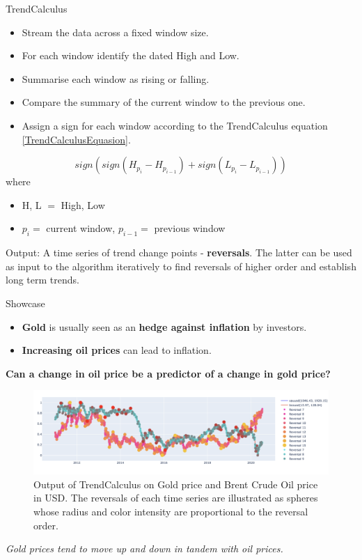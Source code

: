 \documentclass[final]{beamer}
\newlength{\colwidth}
\begin{document}
\begin{frame}[fragile]
\begin{columns}[t]
\begin{column}{\colwidth}
\begin{block}{TrendCalculus}
    \begin{itemize}
    \item Stream the data across a fixed window size. 
    \item For each window identify the dated High and Low. 
    \item Summarise each window as rising or falling.
    \item Compare the summary of the current window to the previous one. 
    \item Assign a sign for each window according to the TrendCalculus equation \ref{TrendCalculusEquasion}. 
    \end{itemize}
    \begin{equation}\label{TrendCalculusEquasion}
        sign(sign(H_{p_i}-H_{p_{i-1}})+sign(L_{p_i}-L_{p_{i-1}}))
    \end{equation} 
    where 
    \begin{itemize}
        \item H, L $=$ High, Low
        \item $p_i=$ current window,\hspace{0.4cm} $p_{i-1}=$ previous window
    \end{itemize}
   Output: A time series of trend change points - \textsf{\textbf{reversals}}. The latter can be used as input to the algorithm iteratively to find reversals of higher order and establish long term trends.
   \end{block}
   
   \begin{block}{Showcase}
  \begin{itemize}
      \item \textsf{\textbf{Gold}} is usually seen as an \textsf{\textbf{hedge against inflation}} by investors. \item \textsf{\textbf{Increasing oil prices}} can lead to inflation.
  \end{itemize}
  \textsf{\textbf{Can a change in oil price be a predictor of a change in gold price?}}
  \vspace{-1.25in}
  \begin{figure}[h!]
      \centering
      \includegraphics[width=1.05\textwidth]{GoldOil.png}
      \vspace{-0.8in}
      \caption{Output of TrendCalculus on Gold price and Brent Crude Oil price in USD. The reversals of each time series are illustrated as spheres whose radius and color intensity are proportional to the reversal order.}
      \label{fig:GoldOil}
  \end{figure}
  \textsf{\textit{Gold prices tend to move up and down in tandem with oil prices.}}
  \end{block}
   

\end{column}
\end{columns}
\end{frame}
\end{document}

